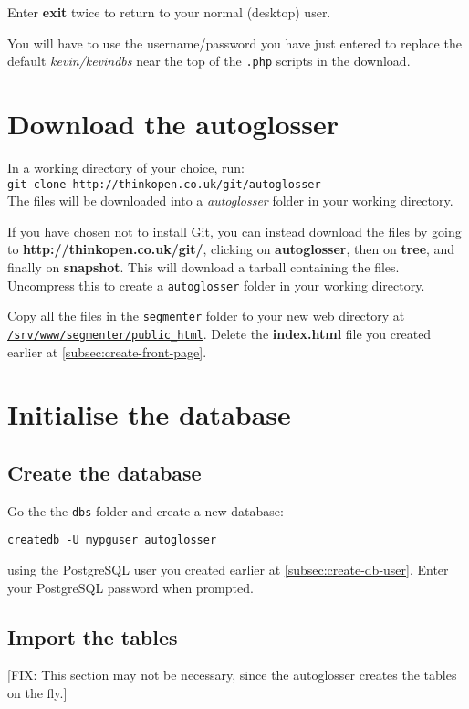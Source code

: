 \documentclass[a4paper,10pt]{article}
\begin{document}
Enter \textbf{exit} twice to return to your normal (desktop) user.

You will have to use the username/password you have just entered to replace the default \textit{kevin/kevindbs} near the top of the \texttt{.php} scripts in the download.

\section{Download the autoglosser}

In a working directory of your choice, run:\\
\texttt{git clone http://thinkopen.co.uk/git/autoglosser}\\
The files will be downloaded into a \textit{autoglosser} folder in your working directory.

If you have chosen not to install Git, you can instead download the files by going to \textbf{http://thinkopen.co.uk/git/}, clicking on \textbf{autoglosser}, then on \textbf{tree}, and finally on \textbf{snapshot}.  This will download a tarball containing the files.  Uncompress this to create a \texttt{autoglosser} folder in your working directory.

Copy all the files in the \texttt{segmenter} folder to your new web directory at \texttt{\url{/srv/www/segmenter/public_html}}.  Delete the \textbf{index.html} file you created earlier at \ref{subsec:create-front-page}.

\section{Initialise the database}

\subsection{Create the database}

Go the the \texttt{dbs} folder and create a new database:

\texttt{createdb -U mypguser autoglosser}

using the PostgreSQL user you created earlier at \ref{subsec:create-db-user}.  Enter your PostgreSQL password when prompted.

\subsection{Import the tables}

[FIX: This section may not be necessary, since the autoglosser creates the tables on the fly.]
\end{document}
